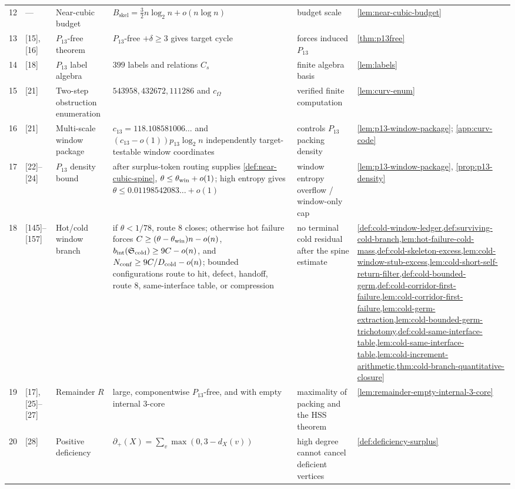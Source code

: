 \documentclass[11pt]{article}
\newcommand{\defp}{\partial_+}
\begin{document}
{\begin{longtable}{C{0.04\textwidth} L{0.13\textwidth} L{0.17\textwidth} L{0.25\textwidth} L{0.21\textwidth} L{0.12\textwidth}}
12 & --- & Near-cubic budget & $B_{\mathrm{skel}}=\frac32 n\log_2n+o(n\log n)$ & budget scale & \cref{lem:near-cubic-budget} \\
13 & [15], [16] & $P_{13}$-free theorem & $P_{13}$-free $+\delta\ge3$ gives target cycle & forces induced $P_{13}$ & \cref{thm:p13free} \\
14 & [18] & $P_{13}$ label algebra & $399$ labels and relations $C_s$ & finite algebra basis & \cref{lem:labels} \\
15 & [21] & Two-step obstruction enumeration & $543958,432672,111286$ and $c_\Omega$ & verified finite computation & \cref{lem:curv-enum} \\
16 & [21] & Multi-scale window package & $c_{13}=118.108581006\ldots$ and \((c_{13}-o(1))p_{13}\log_2 n\) independently target-testable window coordinates & controls $P_{13}$ packing density & \cref{lem:p13-window-package}; \cref{app:curv-code} \\
17 & [22]--[24] & $P_{13}$ density bound & after surplus-token routing supplies \cref{def:near-cubic-spine}, $\theta\le\theta_{\rm win}+o(1)$; high entropy gives $\theta\le0.01198542083\ldots+o(1)$ & window entropy overflow / window-only cap & \cref{lem:p13-window-package}, \cref{prop:p13-density} \\
18 & [145]--[157] & Hot/cold window branch & if \(\theta<1/78\), route 8 closes; otherwise hot failure forces \(C\ge(\theta-\theta_{\rm win})n-o(n)\), \(b_{\rm int}(\mathfrak S_{\rm cold})\ge9C-o(n)\), and \(N_{\rm conf}\ge9C/D_{\rm cold}-o(n)\); bounded configurations route to hit, defect, handoff, route 8, same-interface table, or compression & no terminal cold residual after the spine estimate & \cref{def:cold-window-ledger,def:surviving-cold-branch,lem:hot-failure-cold-mass,def:cold-skeleton-excess,lem:cold-window-stub-excess,lem:cold-short-self-return-filter,def:cold-bounded-germ,def:cold-corridor-first-failure,lem:cold-corridor-first-failure,lem:cold-germ-extraction,lem:cold-bounded-germ-trichotomy,def:cold-same-interface-table,lem:cold-same-interface-table,lem:cold-increment-arithmetic,thm:cold-branch-quantitative-closure} \\
19 & [17], [25]--[27] & Remainder $R$ & large, componentwise $P_{13}$-free, and with empty internal $3$-core & maximality of packing and the HSS theorem & \cref{lem:remainder-empty-internal-3-core} \\
20 & [28] & Positive deficiency & $\defp(X)=\sum_v\max(0,3-d_X(v))$ & high degree cannot cancel deficient vertices & \cref{def:deficiency-surplus} \\

\end{longtable}}
\end{document}
